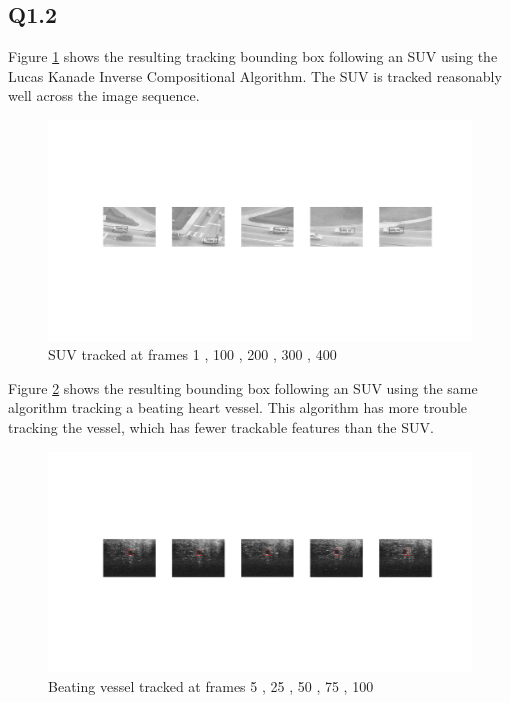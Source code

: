\documentclass[12pt]{article}
\begin{document}
\subsection{Q1.2}

Figure \ref{fig:suv} shows the resulting tracking bounding box following an SUV using the Lucas Kanade Inverse Compositional Algorithm. The SUV is tracked reasonably well across the image sequence.

\begin{figure}[H]
\centering
\includegraphics[page=1,width=1.0\textwidth]{q13_suv}
\caption{ SUV tracked at frames 1 , 100 , 200 , 300 , 400 } 
\label{fig:suv}
\end{figure}   

Figure \ref{fig:usvessel} shows the resulting bounding box following an SUV using the same algorithm tracking a beating heart vessel. This algorithm has more trouble tracking the vessel, which has fewer trackable  features than the SUV.

\begin{figure}[H]
\centering
\includegraphics[page=1,width=1.0\textwidth]{q13_us}
\caption{ Beating vessel tracked at frames 5 , 25 , 50 , 75 , 100 } 
\label{fig:usvessel}
\end{figure}   
\end{document}
